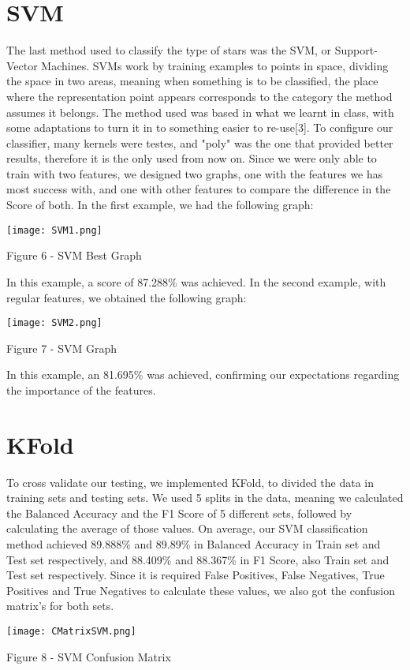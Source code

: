 \documentclass[conference]{IEEEtran}
\begin{document}
\section{SVM}
The last method used to classify the type of stars was the SVM, or Support-Vector Machines. SVMs work by training examples to points in space, dividing the space in two areas, meaning when something is to be classified, the place where the representation point appears corresponds to the category the method assumes it belongs. The method used was based in what we learnt in class, with some adaptations to turn it in to something easier to re-use[3]. To configure our classifier, many kernels were testes, and "poly" was the one that provided better results, therefore it is the only used from now on. Since we were only able to train with two features, we designed two graphs, one with the features we has most success with, and one with other features to compare the difference in the Score of both. In the first example, we had the following graph:
\par
\texttt{[image: SVM1.png]}
\caption{Figure 6 - SVM Best Graph}
\par
In this example, a score of 87.288\% was achieved. In the second example, with regular features, we obtained the following graph:
\par
\texttt{[image: SVM2.png]}
\caption{Figure 7 - SVM Graph}
\par
In this example, an 81.695\% was achieved, confirming our expectations regarding the importance of the features. 

\section{KFold}
To cross validate our testing, we implemented KFold, to divided the data in training sets and testing sets. We used 5 splits in the data, meaning we calculated the Balanced Accuracy and the F1 Score of 5 different sets, followed by calculating the average of those values. On average, our SVM classification method achieved 89.888\% and 89.89\% in Balanced Accuracy in Train set and Test set respectively, and 88.409\% and 88.367\% in F1 Score, also Train set and Test set respectively. Since it is required False Positives, False Negatives, True Positives and True Negatives to calculate these values, we also got the confusion matrix's for both sets. \\
\par 
\texttt{[image: CMatrixSVM.png]}
\caption{Figure 8 - SVM Confusion Matrix}
\par
\end{document}
